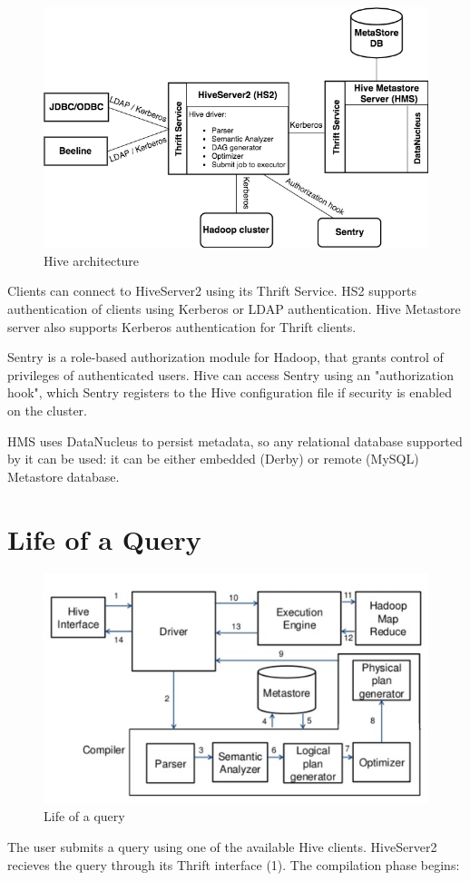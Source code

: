 \begin{figure}[H]
	\includegraphics[width=140mm, keepaspectratio]{figures/Hive_architecture.png}
	\centering
	\caption{Hive architecture}
\end{figure}

Clients can connect to HiveServer2 using its Thrift Service. HS2 supports authentication of clients using Kerberos or LDAP authentication. Hive Metastore server also supports Kerberos authentication for Thrift clients.

Sentry is a role-based authorization module for Hadoop, that grants control of privileges of authenticated users. Hive can access Sentry using an "authorization hook", which Sentry registers to the Hive configuration file if security is enabled on the cluster.

HMS uses DataNucleus to persist metadata, so any relational database supported by it can be used: it can be either embedded (\eg Derby) or remote (\eg MySQL) Metastore database.

\section{Life of a Query}
\begin{figure}[H]
	\includegraphics[width=150mm, keepaspectratio]{figures/hive-query.png}
	\centering
	\caption{Life of a query  \cite{Hive-query-figure}}
\end{figure}
The user submits a query using one of the available Hive clients. HiveServer2 recieves the query through its Thrift interface (1). The compilation phase begins:

